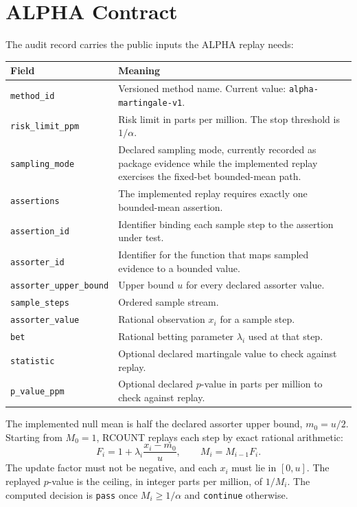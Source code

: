 \section{ALPHA Contract}

The audit record carries the public inputs the ALPHA replay needs:

\begin{center}
\small
\begin{tabularx}{\textwidth}{lX}
\toprule
Field & Meaning \\
\midrule
\texttt{method\_id} & Versioned method name. Current value: \texttt{alpha-martingale-v1}. \\
\texttt{risk\_limit\_ppm} & Risk limit in parts per million. The stop threshold is $1/\alpha$. \\
\texttt{sampling\_mode} & Declared sampling mode, currently recorded as package evidence while the implemented replay exercises the fixed-bet bounded-mean path. \\
\texttt{assertions} & The implemented replay requires exactly one bounded-mean assertion. \\
\texttt{assertion\_id} & Identifier binding each sample step to the assertion under test. \\
\texttt{assorter\_id} & Identifier for the function that maps sampled evidence to a bounded value. \\
\texttt{assorter\_upper\_bound} & Upper bound $u$ for every declared assorter value. \\
\texttt{sample\_steps} & Ordered sample stream. \\
\texttt{assorter\_value} & Rational observation $x_i$ for a sample step. \\
\texttt{bet} & Rational betting parameter $\lambda_i$ used at that step. \\
\texttt{statistic} & Optional declared martingale value to check against replay. \\
\texttt{p\_value\_ppm} & Optional declared $p$-value in parts per million to check against replay. \\
\bottomrule
\end{tabularx}
\end{center}

The implemented null mean is half the declared assorter upper bound,
$m_0=u/2$. Starting from $M_0=1$, RCOUNT replays each step by exact rational
arithmetic:
\[
  F_i = 1 + \lambda_i\frac{x_i-m_0}{u}, \qquad
  M_i = M_{i-1}F_i.
\]
The update factor must not be negative, and each $x_i$ must lie in
$[0,u]$. The replayed $p$-value is the ceiling, in integer parts per million,
of $1/M_i$. The computed decision is \texttt{pass} once $M_i \ge 1/\alpha$ and
\texttt{continue} otherwise.
